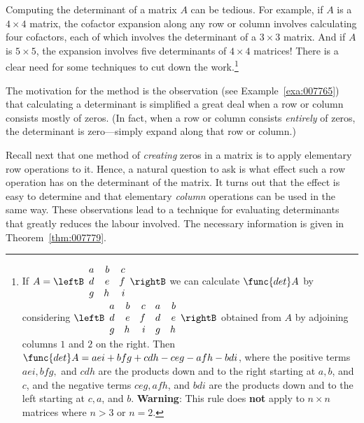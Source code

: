 Computing the determinant of a matrix $A$ can be tedious. For example, if $A$
 is a $4 \times 4$ matrix, the cofactor expansion along any row or column 
involves calculating four cofactors, each of which involves the 
determinant of a $3 \times 3$ matrix. And if $A$ is $5 \times 5$, the expansion 
involves five determinants of $4 \times 4$ matrices! There is a clear need for 
some techniques to cut down the work.\footnote{If $A = \leftB \begin{array}{rrr}
a & b & c \\
d & e & f \\
g & h & i 
\end{array} \rightB$ 
 we can calculate $\func{det } A$ by considering 
$\leftB \begin{array}{rrrrr}
a & b & c & a & b\\
d & e & f & d & e \\
g & h & i & g & h 
\end{array} \rightB$ 
obtained from $A$ by adjoining columns $1$ and $2$ on the right. Then $\func{det } A = aei + bfg + cdh - ceg - afh - bdi$, where the positive terms $aei, bfg,$ and $cdh$ are the products down and to the right starting at $a,b$, and $c$, and the negative terms $ceg, afh$, and $bdi$ are the products down and to the left starting at $c, a$, and $b$. \textbf{Warning}: This rule does \textbf{not} apply to $n \times n$ matrices where $n > 3$ or $n = 2$.}


The motivation for the method is the observation (see Example~\ref{exa:007765})
 that calculating a determinant is simplified a great deal when a row or
 column consists mostly of zeros. (In fact, when a row or column 
consists \textit{entirely} of zeros, the determinant is zero---simply expand along that row or column.)


Recall next that one method of \textit{creating}
 zeros in a matrix is to apply elementary row operations to it. Hence, a
 natural question to ask is what effect such a row operation has on the 
determinant of the matrix. It turns out that the effect is easy to 
determine and that elementary \textit{column} operations can be used in 
the same way. These observations lead to a technique for evaluating 
determinants that greatly reduces the labour involved. The necessary 
information is given in Theorem~\ref{thm:007779}.


